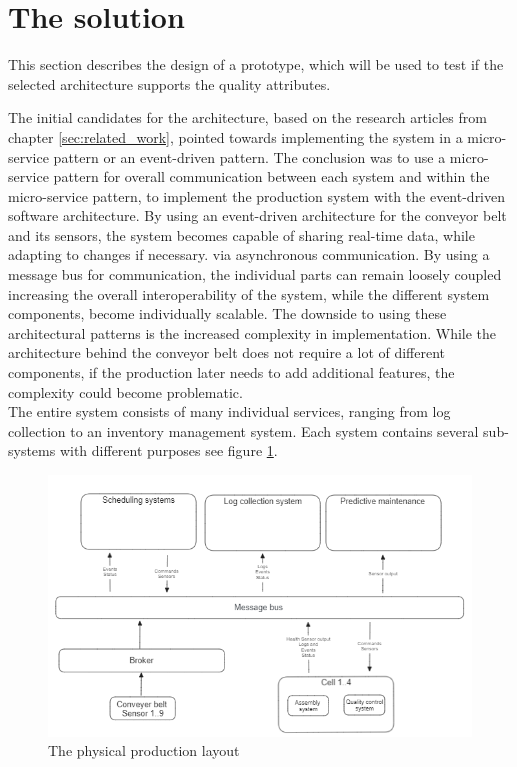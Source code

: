 \section{The solution}
\label{sec:middleware_architecture}


This section describes the design of a prototype, which will be used to test if the selected architecture supports the quality attributes.

The initial candidates for the architecture, based on the research articles from chapter \ref{sec:related_work}, pointed towards implementing the system in a micro-service pattern or an event-driven pattern.
The conclusion was to use a micro-service pattern for overall communication between each system and within the micro-service pattern, to implement the production system with the event-driven software architecture. 
By using an event-driven architecture for the conveyor belt and its sensors, the system becomes capable of sharing real-time data, while adapting to changes if necessary. via asynchronous communication. 
By using a message bus for communication, the individual parts can remain loosely coupled increasing the overall interoperability of the system, while the different system components, become individually scalable. The downside to using these architectural patterns is the increased complexity in implementation. While the architecture behind the conveyor belt does not require a lot of different components, if the production later needs to add additional features, the complexity could become problematic.
\\
The entire system consists of many individual services, ranging from log collection to an inventory management system. Each system contains several sub-systems with different purposes see figure \ref{figure:2}.
\begin{figure}[ht]
    \centering
    \includegraphics[scale=0.5]{Images/OverallArchitecture.png}
    \caption{The physical production layout}
    \label{figure:2}
\end{figure}


